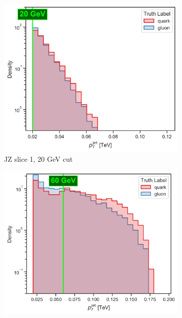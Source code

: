 \begin{figure}[!htb]
    \centering
    \begin{subfigure}[t]{0.49\textwidth}
        \centering
        \includegraphics[width=\linewidth]{src/plots/pt_jet_label_1.jpg}
        \caption{JZ slice 1, 20 GeV cut}
        \label{fig:jz_separete_1}
    \end{subfigure}
    \begin{subfigure}[t]{0.49\textwidth}
        \centering
        \includegraphics[width=\linewidth]{src/plots/pt_jet_label_2.jpg}

\end{subfigure}
\end{figure}
